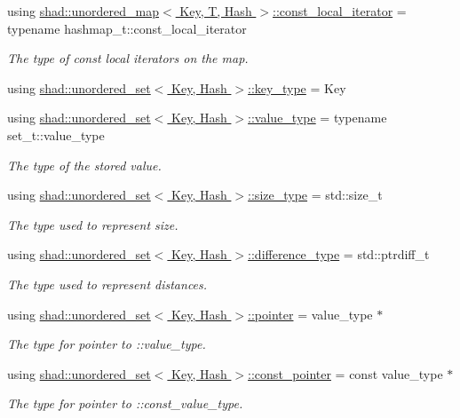 \begin{DoxyCompactItemize}
using \hyperlink{group__Types_ga2242fb2071462a5f8a420d8cd8a7d8e8}{shad\-::unordered\-\_\-map$<$ Key, T, Hash $>$\-::const\-\_\-local\-\_\-iterator} = typename hashmap\-\_\-t\-::const\-\_\-local\-\_\-iterator
\begin{DoxyCompactList}\small\item\em The type of const local iterators on the map. \end{DoxyCompactList}\item 
using \hyperlink{group__Types_gae860c65ed861f8aa69b0360638f4ad5d}{shad\-::unordered\-\_\-set$<$ Key, Hash $>$\-::key\-\_\-type} = Key
\item 
using \hyperlink{group__Types_ga56832ea0d8218bf22f59a2e8ff4de499}{shad\-::unordered\-\_\-set$<$ Key, Hash $>$\-::value\-\_\-type} = typename set\-\_\-t\-::value\-\_\-type
\begin{DoxyCompactList}\small\item\em The type of the stored value. \end{DoxyCompactList}\item 
using \hyperlink{group__Types_gaf733341726e3097cf440257afa76d76a}{shad\-::unordered\-\_\-set$<$ Key, Hash $>$\-::size\-\_\-type} = std\-::size\-\_\-t
\begin{DoxyCompactList}\small\item\em The type used to represent size. \end{DoxyCompactList}\item 
using \hyperlink{group__Types_gaa58125290d23043a3bdfa2430291a1e8}{shad\-::unordered\-\_\-set$<$ Key, Hash $>$\-::difference\-\_\-type} = std\-::ptrdiff\-\_\-t
\begin{DoxyCompactList}\small\item\em The type used to represent distances. \end{DoxyCompactList}\item 
using \hyperlink{group__Types_ga84503e3a7375cd54f32da739fe21ecc9}{shad\-::unordered\-\_\-set$<$ Key, Hash $>$\-::pointer} = value\-\_\-type $\ast$
\begin{DoxyCompactList}\small\item\em The type for pointer to \-::value\-\_\-type. \end{DoxyCompactList}\item 
using \hyperlink{group__Types_ga3d079442c0e215d47f0c93f05b2ddb1f}{shad\-::unordered\-\_\-set$<$ Key, Hash $>$\-::const\-\_\-pointer} = const value\-\_\-type $\ast$
\begin{DoxyCompactList}\small\item\em The type for pointer to \-::const\-\_\-value\-\_\-type. \end{DoxyCompactList}\item 

\end{DoxyCompactItemize}

